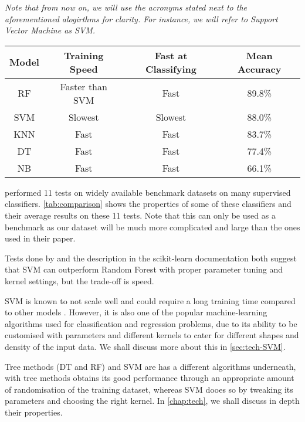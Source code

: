 \textit{Note that from now on, we will use the acronyms stated next to the aforementioned alogirthms for clarity. For instance, we will refer to Support Vector Machine as SVM.}
\\

\parbox{\linewidth}{
  \centering
  \begin{tabular}{|c|c|c|c|}
    \hline
    \textbf{Model} & \textbf{Training Speed} & \textbf{Fast at Classifying} & \textbf{Mean Accuracy}
    \\\hline
    RF       & Faster than SVM  & Fast    & 89.8\%
    \\\hline
    SVM      & Slowest          & Slowest & 88.0\%
    \\\hline
    KNN      & Fast             & Fast    & 83.7\%
    \\\hline
    DT       & Fast             & Fast    & 77.4\%
    \\\hline
    NB       & Fast             & Fast    & 66.1\% 
    \\\hline
  \end{tabular}

  \label{tab:comparison}
}

 performed 11 tests on widely available benchmark datasets on many supervised classifiers. \autoref{tab:comparison} shows the properties of some of these classifiers and their average results on these 11 tests. Note that this can only be used as a benchmark as our dataset will be much more complicated and large than the ones used in their paper. 

Tests done by  and the description in the scikit-learn documentation both suggest that SVM can outperform Random Forest with proper parameter tuning and kernel settings, but the trade-off is speed.

SVM is known to not scale well and could require a long training time compared to other models \cite{compare-supervised}. However, it is also one of the popular machine-learning algorithms used for classification and regression problems, due to its ability to be customised with parameters and different kernels to cater for different shapes and density of the input data. We shall discuss more about this in \autoref{sec:tech-SVM}.

Tree methods (DT and RF) and SVM are has a different algorithms underneath, with tree methods obtains its good performance through an appropriate amount of randomisation of the training dataset, whereas SVM dooes so by tweaking its parameters and choosing the right kernel. In \autoref{chap:tech}, we shall discuss in depth their properties.

